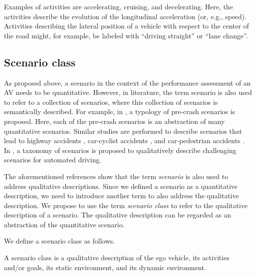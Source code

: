 Examples of activities are accelerating, cruising, and decelerating. Here, the activities describe the evolution of the longitudinal acceleration (or, e.g., speed). Activities describing the lateral position of a vehicle with respect to the center of the road might, for example, be labeled with ``driving straight'' or ``lane change''.



\subsection{Scenario class}
\label{sec:scenario class}

\cbstart
As proposed above, a scenario in the context of the performance assessment of an AV needs to be quantitative. 
However, in literature, the term scenario is also used to refer to a collection of scenarios, where this collection of scenarios is semantically described. For example, in \cite{USDoT2007precrashscenarios}, a typology of pre-crash scenarios is proposed. Here, each of the pre-crash scenarios is an abstraction of many quantitative scenarios. Similar studies are performed to describe scenarios that lead to highway accidents \cite{adaptive2017d73}, car-cyclist accidents \cite{opdencamp2014cats}, and car-pedestrian accidents \cite{lenard2011typical}. In \cite{catapult2017taxonomy}, a taxonomy of scenarios is proposed to qualitatively describe challenging scenarios for automated driving.

The aforementioned references \cite{USDoT2007precrashscenarios, adaptive2017d73, opdencamp2014cats, lenard2011typical, catapult2017taxonomy} show that the term \emph{scenario} is also used to address qualitative descriptions. Since we defined a scenario as a quantitative description, we need to introduce another term to also address the qualitative description. We propose to use the term \emph{scenario class} to refer to the qualitative description of a scenario. The qualitative description can be regarded as an abstraction of the quantitative scenario.
\cbend

We define a scenario class as follows.
\begin{definition} \label{def:scenario class}
	A scenario class is a qualitative description of the ego vehicle, its activities and/or goals, its static environment, and its dynamic environment.
\end{definition}

